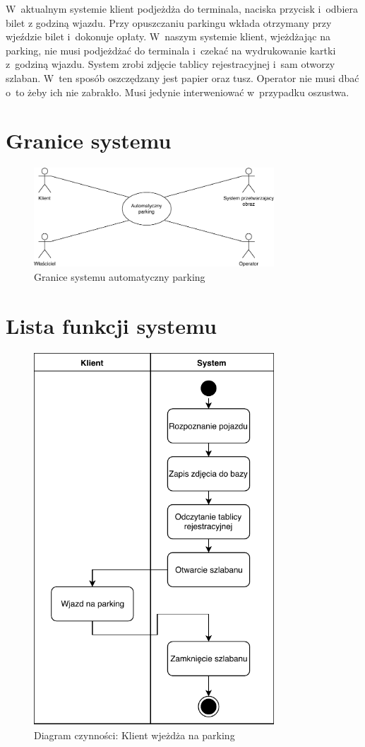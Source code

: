 W~aktualnym systemie klient podjeżdża do terminala, naciska przycisk i~odbiera bilet z godziną wjazdu. Przy opuszczaniu parkingu wkłada otrzymany przy wjeździe bilet i~dokonuje opłaty.
W~naszym systemie klient, wjeżdżając na parking, nie musi podjeżdżać do terminala i~czekać na wydrukowanie kartki z~godziną wjazdu. System zrobi zdjęcie tablicy rejestracyjnej i~sam otworzy szlaban. W~ten sposób oszczędzany jest papier oraz tusz. Operator nie musi dbać o~to żeby ich nie zabrakło. Musi jedynie interweniować w~przypadku oszustwa.


\section{Granice systemu}
\begin{figure}[H]
	\centering
	\includegraphics[width=90mm]{diagramy/graniceSystemu.pdf}
	\caption{Granice systemu automatyczny parking \label{overflow}}
\end{figure}

\section{Lista funkcji systemu}


\begin{figure}[H]
	\centering
	\includegraphics[width=90mm]{diagramy/DiagCzynWjazd.pdf}
	\caption{Diagram czynności: Klient wjeżdża na parking \label{overflow}}
\end{figure}


